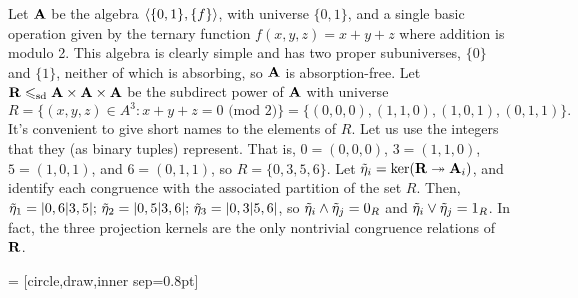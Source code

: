 {\begin{example}
  Let $\mathbf{A}$ be the algebra $\langle\{0,1\}, \{f\}\rangle$, with universe $\{0,1\}$,
  and a single basic operation given by the ternary function $f(x,y,z) = x+y+z$
  where addition is modulo 2.  This algebra is clearly simple and has two proper
  subuniverses, $\{0\}$ and $\{1\}$, neither of which is absorbing, so $\mathbf{A}$ is
  absorption-free.  Let $\mathbf{R} \leqslant_{\mathrm{sd}} \mathbf{A} \times \mathbf{A} \times \mathbf{A}$ be the subdirect
  power of $\mathbf{A}$ with universe 
  \[ R = \{(x,y,z)\in A^3: x+y+z=0 \text{ (mod $2$)}\} = \{(0,0,0), (1,1,0), (1,0,1), (0,1,1) \}.\] 
  It's convenient to give short names to the elements of $R$.  
  Let us use the integers that they (as binary tuples) represent.
  That is, $0 = (0,0,0)$, $3 = (1,1,0)$,  $5 = (1,0,1)$,  and 
  $6 = (0,1,1)$,   
  so $R = \{0, 3, 5, 6\}$.
  Let $\tilde{\eta}_i = \ker(\mathbf{R} \twoheadrightarrow \mathbf{A}_i)$, and identify each
  congruence with the associated partition of the set $R$. Then,
  $\tilde{\eta}_1 = |0,6|3,5|; \,  \tilde{\eta}_2 = |0,5|3,6|; \,  \tilde{\eta}_3 = |0,3|5,6|$,
  so $\tilde{\eta}_i \wedge \tilde{\eta}_j = 0_R$ and $\tilde{\eta}_i \vee \tilde{\eta}_j = 1_R$.
  In fact, the three projection kernels are the only nontrivial congruence
  relations of $\mathbf{R}$.

   = [circle,draw,inner sep=0.8pt]
  \begin{center}
  \end{center}


\end{example}}

